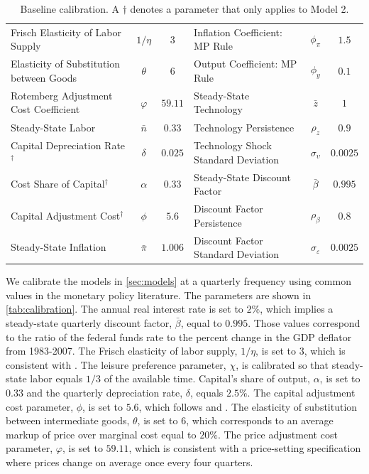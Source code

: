 \documentclass[12pt,final]{article}
\let\orgautoref\autoref
\renewcommand{\autoref}
        {\def\figureautorefname{figure}%
         \def\subfigureautorefname{panel}%
         \def\tableautorefname{table}%
         \def\sectionautorefname{section}%
         \def\subsectionautorefname{section}%
         \def\subsubsectionautorefname{section}%
         \orgautoref}
\begin{document}
\begin{table}[t]\scriptsize
  \begin{tabular*}{\textwidth}{l@{\extracolsep{\fill}}cclcc}
  \toprule
  Frisch Elasticity of Labor Supply       &$1/\eta$   & $3$    & Inflation Coefficient: MP Rule            &$\phi_\pi$    &$1.5$   \\
  Elasticity of Substitution between Goods&$\theta$   & $6$    & Output Coefficient: MP Rule               &$\phi_y$      &$0.1$   \\
  Rotemberg Adjustment Cost Coefficient   &$\varphi$  & $59.11$& Steady-State Technology                   &$\bar{z}$     &$1$     \\
  Steady-State Labor                      &$\bar{n}$  & $0.33$ & Technology Persistence                    &$\rho_z$      &$0.9$   \\
  Capital Depreciation Rate$^\dag$        &$\delta$   & $0.025$& Technology Shock Standard Deviation       &$\sigma_\upsilon$&$0.0025$\\
  Cost Share of Capital$^\dag$            &$\alpha$   & $0.33$ & Steady-State Discount Factor              &$\bar{\beta}$ &$0.995$ \\
  Capital Adjustment Cost$^\dag$          &$\phi$     & $5.6$  & Discount Factor Persistence               &$\rho_\beta$  &$0.8$   \\
  Steady-State Inflation                  &$\bar{\pi}$& $1.006$& Discount Factor Standard Deviation        &$\sigma_\varepsilon$&$0.0025$\\
  \bottomrule
  \end{tabular*}
  \caption{Baseline calibration. A $\dag$ denotes a parameter that only applies to Model 2.}
  \label{tab:calibration}
\end{table}\normalsize

We calibrate the models in \autoref{sec:models} at a quarterly frequency using common values in the monetary policy literature. The parameters are shown in \autoref{tab:calibration}. The annual real interest rate is set to $2\%$, which implies a steady-state quarterly discount factor, $\bar{\beta}$, equal to $0.995$. Those values correspond to the ratio of the federal funds rate to the percent change in the GDP deflator from 1983-2007. The Frisch elasticity of labor supply, $1/\eta$, is set to $3$, which is consistent with \citet{Peterman2012}. The leisure preference parameter, $\chi$, is calibrated so that steady-state labor equals $1/3$ of the available time. Capital's share of output, $\alpha$, is set to $0.33$ and the quarterly depreciation rate, $\delta$, equals $2.5\%$. The capital adjustment cost parameter, $\phi$, is set to $5.6$, which follows \citet{Eberly1997} and \citet{ErcegLevin2003}. The elasticity of substitution between intermediate goods, $\theta$, is set to $6$, which corresponds to an average markup of price over marginal cost equal to $20\%$. The price adjustment cost parameter, $\varphi$, is set to $59.11$, which is consistent with a \citet{Calvo1983} price-setting specification where prices change on average once every four quarters.
\end{document}
